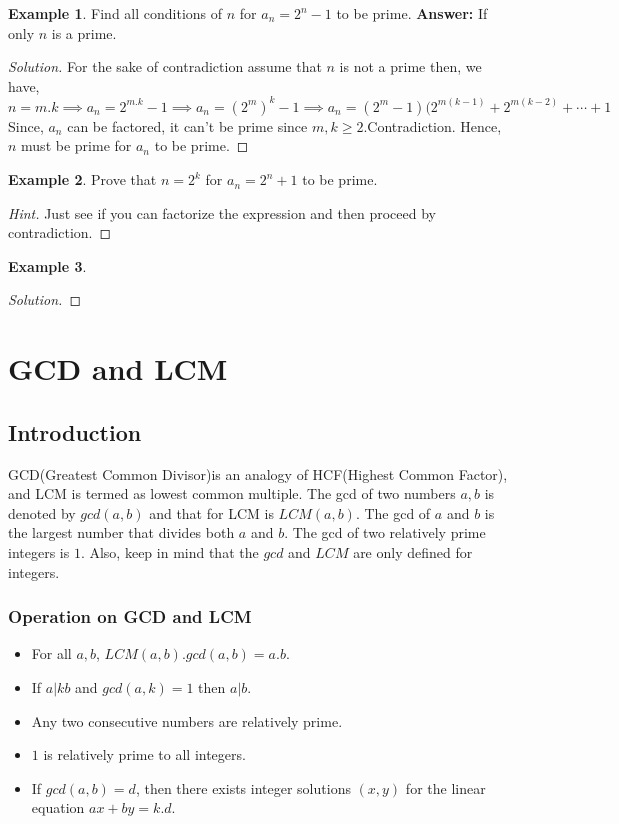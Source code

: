\documentclass[a4paper,oneside,12 pt]{book}
\theoremstyle{definition}
\newtheorem{exmp}{Example}[section]
\theoremstyle{definition}
\theoremstyle{definition}
\begin{document}
\begin{exmp} 
Find all conditions of $n$ for $a_n=2^n-1$ to be prime.
\textbf{Answer:} If only $n$ is a prime.
\begin{proof}[Solution]
For the sake of contradiction assume that $n$ is not a prime then, we have,
$$n=m.k \implies a_n=2^{m.k}-1 \implies a_n=(2^m)^k-1 \implies a_n=(2^m-1)(2^{m(k-1)}+2^{m(k-2)}+\cdots+1$$
Since, $a_n$ can be factored, it can't be prime since $m,k \geq 2$.Contradiction.
Hence, $n$ must be prime for $a_n$ to be prime.
\end{proof}
\end{exmp} 

\begin{exmp} 
Prove that $n=2^k$ for $a_n=2^n+1$ to be prime.
\begin{proof} [Hint]
Just see if you can factorize the expression and then proceed by contradiction.
\end{proof}

\end{exmp} 

\begin{exmp} 
\begin{proof} [Solution]

\end{proof}
\end{exmp} 


\chapter{GCD and LCM}
\section{Introduction}
GCD(Greatest Common Divisor)is an analogy of HCF(Highest Common Factor), and LCM is termed as lowest common multiple. The gcd of two numbers $a,b$ is denoted by $gcd(a,b)$ and that for LCM is $LCM(a,b)$. The gcd of $a$ and $b$ is the largest number that divides both $a$ and $b$. The gcd of two relatively prime integers is $1$. Also, keep in mind that the $gcd$ and $LCM$ are only defined for integers.
\subsection{Operation on GCD and LCM}
\begin{itemize}
\item For all $a,b$, $LCM(a,b).gcd(a,b)=a.b$.
\item If $a|kb$ and $gcd(a,k)=1$ then $a|b$.
\item Any two consecutive numbers are relatively prime.
\item $1$ is relatively prime to all integers.
\item If $gcd(a,b)=d$, then there exists integer solutions $(x,y)$ for the linear equation $ax+by=k.d$.
\end{itemize}
\end{document}
